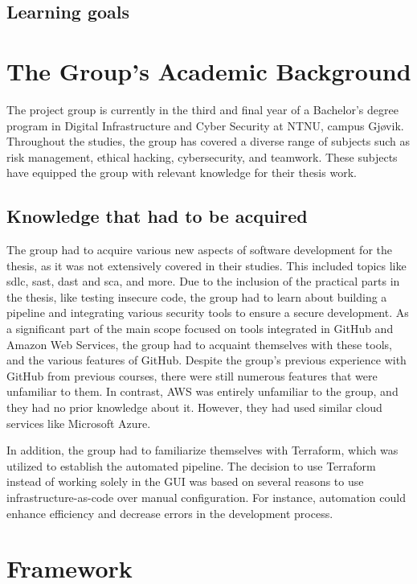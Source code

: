 \subsection{Learning goals} %

\section{The Group’s Academic Background}
The project group is currently in the third and final year of a Bachelor's degree program in Digital Infrastructure and Cyber Security at NTNU, campus Gjøvik. Throughout the studies, the group has covered a diverse range of subjects such as risk management, ethical hacking, cybersecurity, and teamwork. These subjects have equipped the group with relevant knowledge for their thesis work.

\subsection{Knowledge that had to be acquired}
\label{section: Knowledge that had to be acquired}
The group had to acquire various new aspects of software development for the thesis, as it was not extensively covered in their studies. This included topics like \acrshort{sdlc}, \acrlong{sast}, \acrlong{dast} and \acrlong{sca}, and more. Due to the inclusion of the practical parts in the thesis, like testing insecure code, the group had to learn about building a pipeline and integrating various security tools to ensure a secure development. As a significant part of the main scope focused on tools integrated in GitHub and Amazon Web Services, the group had to acquaint themselves with these tools, and the various features of GitHub. Despite the group's previous experience with GitHub from previous courses, there were still numerous features that were unfamiliar to them. In contrast, AWS was entirely unfamiliar to the group, and they had no prior knowledge about it. However, they had used similar cloud services like Microsoft Azure.

In addition, the group had to familiarize themselves with Terraform, which was utilized to establish the automated pipeline. The decision to use Terraform instead of working solely in the GUI was based on several reasons to use infrastructure-as-code over manual configuration. For instance, automation could enhance efficiency and decrease errors in the development process.

\section{Framework}

